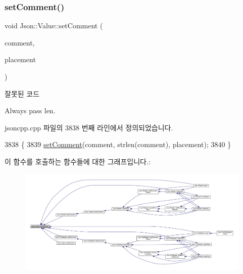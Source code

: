 \subsubsection{\texorpdfstring{set\+Comment()}{setComment()}\hspace{0.1cm}{\footnotesize\ttfamily [1/3]}}
{\footnotesize\ttfamily void Json\+::\+Value\+::set\+Comment (\begin{DoxyParamCaption}\item[{const char $\ast$}]{comment,  }\item[{\hyperlink{namespace_json_a4fc417c23905b2ae9e2c47d197a45351}{Comment\+Placement}}]{placement }\end{DoxyParamCaption})}

\begin{DoxyRefDesc}{잘못된 코드}
\item[\hyperlink{deprecated__deprecated000003}{잘못된 코드}]Always pass len. \end{DoxyRefDesc}


jsoncpp.\+cpp 파일의 3838 번째 라인에서 정의되었습니다.


\begin{DoxyCode}
3838                                                                       \{
3839   \hyperlink{class_json_1_1_value_a29f3a30f7e5d3af6f38d57999bf5b480}{setComment}(comment, strlen(comment), placement);
3840 \}
\end{DoxyCode}
이 함수를 호출하는 함수들에 대한 그래프입니다.\+:
\nopagebreak
\begin{figure}[H]
\begin{center}
\leavevmode
\includegraphics[width=350pt]{class_json_1_1_value_a29f3a30f7e5d3af6f38d57999bf5b480_icgraph}
\end{center}
\end{figure}
\mbox{\label{class_json_1_1_value_a2900152a2887b410a9ddabe278b9d492}} 
